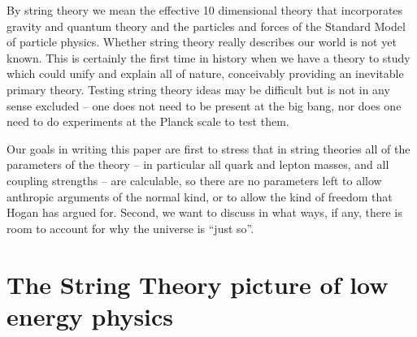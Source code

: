 \documentclass{article}
\begin{document}
By string theory we mean the effective 10
dimensional theory that incorporates gravity and quantum theory and the
particles and forces of the Standard Model of particle physics.  Whether
string theory really describes our world is not yet known.  This is
certainly the first time in history when we have a theory to study which
could unify and explain all of nature, conceivably providing an
inevitable primary theory.  Testing string theory ideas may be difficult
but is not in any sense excluded -- one does not need to be present at
the big bang, nor does one need to do experiments at the Planck
scale to test them.

Our goals in writing this paper are first to stress that in string
theories all of the parameters of the theory -- in particular all
quark and lepton masses, and all coupling strengths -- are calculable,
so there are no parameters left to allow anthropic arguments of the
normal kind, or to allow the kind of freedom that Hogan has argued for.
Second, we want to discuss in what ways, if any, there is room to
account for why the universe is ``just so''.


\section{The String Theory picture of low energy physics}
\end{document}
